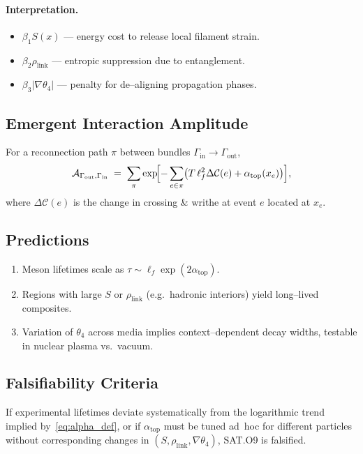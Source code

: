 \documentclass[12pt]{article}
\begin{document}
\paragraph{Interpretation.}
\begin{itemize}
    \item $\beta_1 S(x)$ --- energy cost to release local filament strain.
    \item $\beta_2 \rho_{\text{link}}$ --- entropic suppression due to entanglement.
    \item $\beta_3 |\nabla\theta_4|$ --- penalty for de--aligning propagation phases.
\end{itemize}

\subsection*{Emergent Interaction Amplitude}
For a reconnection path $\pi$ between bundles $\Gamma_{\text{in}}\to\Gamma_{\text{out}}$,
\begin{equation}
\mathcal{A}_{\Gamma_{\text{out}},\Gamma_{\text{in}}}\;=\;
\sum_{\pi}\exp\!\Bigl[-\sum_{e\in\pi}
\bigl(T\,\ell_f^{2}\Delta\mathcal{C}(e)+\alpha_{\text{top}}(x_e)\bigr)\Bigr],
\end{equation}
where $\Delta\mathcal{C}(e)$ is the change in crossing \& writhe at event $e$ located at $x_e$.

\subsection*{Predictions}
\begin{enumerate}
    \item Meson lifetimes scale as $\tau\sim\ell_f\exp(2\alpha_{\text{top}})$.
    \item Regions with large $S$ or $\rho_{\text{link}}$ (e.g.\ hadronic interiors) yield long--lived composites.
    \item Variation of $\theta_4$ across media implies context--dependent decay widths, testable in nuclear plasma vs.\ vacuum.
\end{enumerate}

\subsection*{Falsifiability Criteria}
If experimental lifetimes deviate systematically from the logarithmic trend implied by~\eqref{eq:alpha_def}, or if $\alpha_{\text{top}}$ must be tuned ad~hoc for different particles without corresponding changes in $(S,\rho_{\text{link}},\nabla\theta_4)$, SAT.O9 is falsified.
\end{document}
